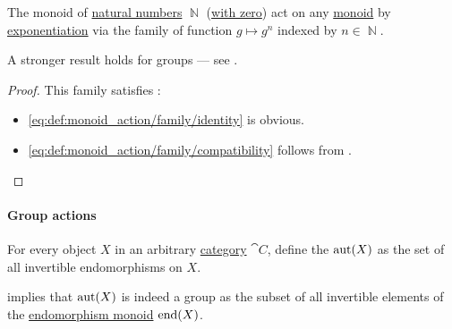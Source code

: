 \begin{proposition}\label{thm:exponentiation_monoid_action}
  The monoid of \hyperref[def:natural_numbers]{natural numbers} \( \BbbN \) (\hyperref[rem:peano_arithmetic_zero]{with zero}) act on any \hyperref[def:monoid]{monoid} by \hyperref[def:monoid/exponentiation]{exponentiation} via the family of function \( g \mapsto g^n \) indexed by \( n \in \BbbN \).
\end{proposition}
\begin{comments}
  \item A stronger result holds for groups --- see .
\end{comments}
\begin{proof}
  This family satisfies :
  \begin{itemize}
    \item \ref{eq:def:monoid_action/family/identity} is obvious.
    \item \ref{eq:def:monoid_action/family/compatibility} follows from .
  \end{itemize}
\end{proof}

\paragraph{Group actions}

\begin{definition}\label{def:automorphism_group}
  For every object \( X \) in an arbitrary \hyperref[def:category]{category} \( \cat{C} \), define the  \( \operatorname{aut}(X) \) as the set of all invertible endomorphisms on \( X \).
\end{definition}
\begin{defproof}
   implies that \( \operatorname{aut}(X) \) is indeed a group as the subset of all invertible elements of the \hyperref[def:endomorphism_monoid]{endomorphism monoid} \( \operatorname{end}(X) \).
\end{defproof}

